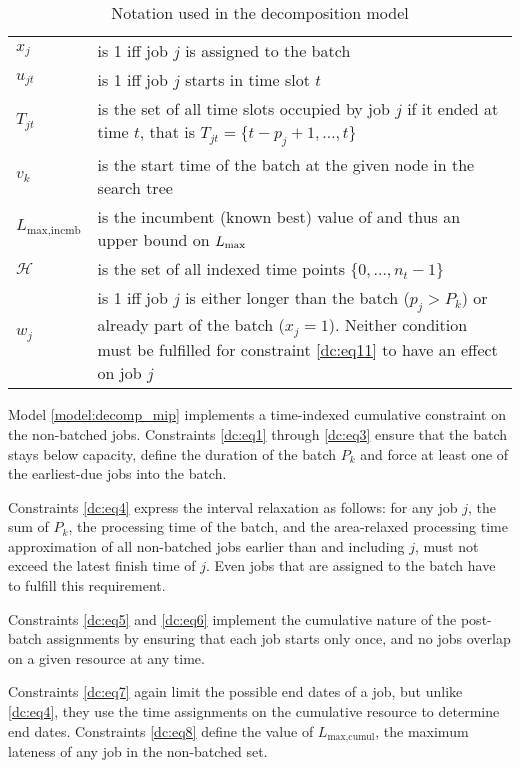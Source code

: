 \documentclass[13pt, letterpaper, oneside]{book}
\begin{document}
\begin{table}[h]
\begin{tabular}{l p{5in}}
$x_j$ & is 1 iff job $j$ is assigned to the batch \\
$u_{jt}$ & is 1 iff job $j$ starts in time slot $t$ \\
$T_{jt}$ & is the set of all time slots occupied by job $j$ if it ended at time
$t$, that is $T_{jt} = \{t - p_j + 1, \dots, t\}$ \\
$v_k$ & is the start time of the batch at the given node in the search tree \\
$L_{\text{max,incmb}}$ & is the incumbent (known best) value of and thus an
upper bound on $L_{\text{max}}$ \\
$\mathcal{H}$ & is the set of all indexed time points $\{0, \dots, n_t - 1\}$ \\
$w_j$ & is 1 iff job $j$ is either longer than the batch ($p_j > P_k$) or
already part of the batch ($x_j = 1$). Neither condition must be fulfilled for constraint
\eqref{dc:eq11} to have an effect on job $j$
\end{tabular}
\caption{Notation used in the decomposition model}
\end{table}

Model \ref{model:decomp_mip} implements a time-indexed cumulative constraint on the
non-batched jobs. Constraints \eqref{dc:eq1} through \eqref{dc:eq3} ensure that the
batch stays below capacity, define the duration of the batch $P_k$ and force at
least one of the earliest-due jobs into the batch.

Constraints \eqref{dc:eq4} express the interval relaxation as follows: for any
job $j$, the sum of $P_k$, the processing time of the batch, and the
area-relaxed processing time approximation of all non-batched jobs earlier than
and including $j$, must not exceed the latest finish time of $j$.
Even jobs that are assigned to the batch have to fulfill this requirement.

Constraints \eqref{dc:eq5} and \eqref{dc:eq6} implement the cumulative nature of the
post-batch assignments by ensuring that each job starts only once, and no jobs
overlap on a given resource at any time.

Constraints \eqref{dc:eq7} again limit the possible end dates of a
job, but unlike \eqref{dc:eq4}, they use the time assignments on the cumulative
resource to determine end dates. Constraints \eqref{dc:eq8} define the value of
$L_{\text{max,cumul}}$, the maximum lateness of any job in the non-batched set.
\end{document}
